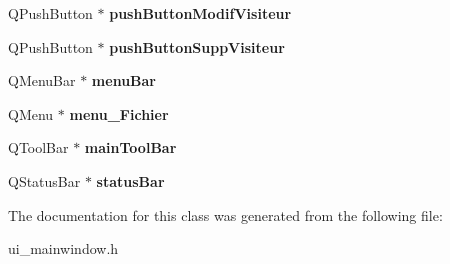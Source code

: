 \begin{DoxyCompactItemize}
\item 
\hypertarget{classUi__MainWindow_af8173b0d70f790869d1b04f19059fefe}{Q\-Push\-Button $\ast$ {\bfseries push\-Button\-Modif\-Visiteur}}\label{classUi__MainWindow_af8173b0d70f790869d1b04f19059fefe}

\item 
\hypertarget{classUi__MainWindow_a0856850158021cdb9f294cbc8b323bc8}{Q\-Push\-Button $\ast$ {\bfseries push\-Button\-Supp\-Visiteur}}\label{classUi__MainWindow_a0856850158021cdb9f294cbc8b323bc8}

\item 
\hypertarget{classUi__MainWindow_a2be1c24ec9adfca18e1dcc951931457f}{Q\-Menu\-Bar $\ast$ {\bfseries menu\-Bar}}\label{classUi__MainWindow_a2be1c24ec9adfca18e1dcc951931457f}

\item 
\hypertarget{classUi__MainWindow_a073cce6e21486d944090502ae6949476}{Q\-Menu $\ast$ {\bfseries menu\-\_\-\-Fichier}}\label{classUi__MainWindow_a073cce6e21486d944090502ae6949476}

\item 
\hypertarget{classUi__MainWindow_a5172877001c8c7b4e0f6de50421867d1}{Q\-Tool\-Bar $\ast$ {\bfseries main\-Tool\-Bar}}\label{classUi__MainWindow_a5172877001c8c7b4e0f6de50421867d1}

\item 
\hypertarget{classUi__MainWindow_a50fa481337604bcc8bf68de18ab16ecd}{Q\-Status\-Bar $\ast$ {\bfseries status\-Bar}}\label{classUi__MainWindow_a50fa481337604bcc8bf68de18ab16ecd}

\end{DoxyCompactItemize}


The documentation for this class was generated from the following file\-:\begin{DoxyCompactItemize}
\item 
ui\-\_\-mainwindow.\-h\end{DoxyCompactItemize}
